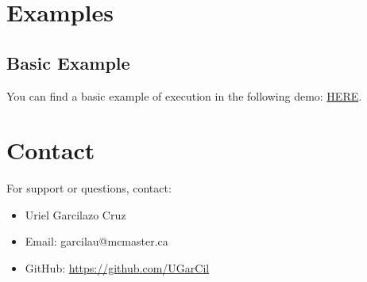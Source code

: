 \documentclass{article}
\begin{document}
\section{Examples}
\subsection{Basic Example}
You can find a basic example of execution in the following demo:
\href{https://replit.com/@garcilau/Sublimat-10#main.py}{HERE}.

\section{Contact}
For support or questions, contact: 
\begin{itemize}
\item Uriel Garcilazo Cruz
\item Email: garcilau@mcmaster.ca
\item GitHub: \url{https://github.com/UGarCil}
\end{itemize}
\end{document}
